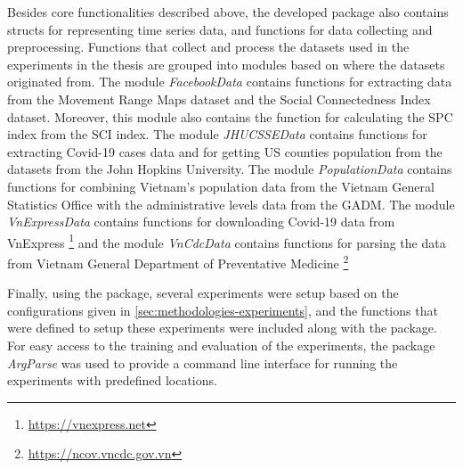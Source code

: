 Besides core functionalities described above, the developed package also contains structs for representing time series data, and functions for data collecting and preprocessing.
Functions that collect and process the datasets used in the experiments in the thesis are grouped into modules based on where the datasets originated from.
The module \textit{FacebookData} contains functions for extracting data from the Movement Range Maps dataset and the Social Connectedness Index dataset.
Moreover, this module also contains the function for calculating the \gls{SPC} index from the \gls{SCI} index.
The module \textit{JHUCSSEData} contains functions for extracting Covid-19 cases data and for getting \gls{US} counties population from the datasets from the John Hopkins University.
The module \textit{PopulationData} contains functions for combining Vietnam's population data from the Vietnam General Statistics Office with the administrative levels data from the \gls{GADM}.
The module \textit{VnExpressData} contains functions for downloading Covid-19 data from VnExpress \footnote{\url{https://vnexpress.net}} and the module \textit{VnCdcData} contains functions for parsing the data from Vietnam General Department of Preventative Medicine \footnote{\url{https://ncov.vncdc.gov.vn}}

Finally, using the package, several experiments were setup based on the configurations given in \autoref{sec:methodologies-experiments}, and the functions that were defined to setup these experiments were included along with the package.
For easy access to the training and evaluation of the experiments, the package \textit{ArgParse} was used to provide a command line interface for running the experiments with predefined locations.
